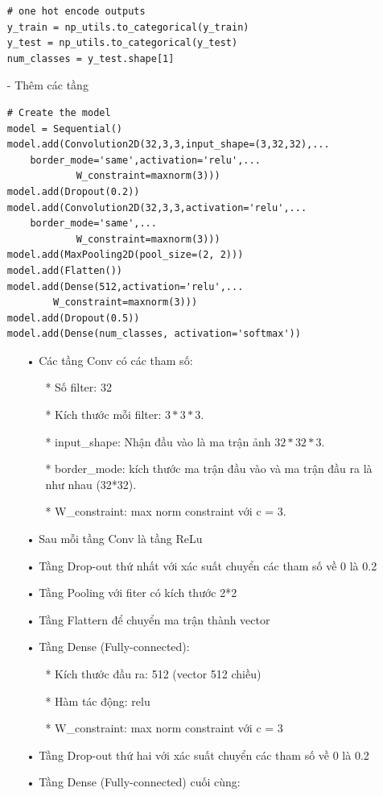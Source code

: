 \documentclass[a4paper,12pt]{report}
\begin{document}
\begin{itemize}
\begin{lstlisting}
# one hot encode outputs
y_train = np_utils.to_categorical(y_train)
y_test = np_utils.to_categorical(y_test)
num_classes = y_test.shape[1]
\end{lstlisting}
\item[-] Thêm các tầng
{\small
\begin{lstlisting}
# Create the model
model = Sequential()
model.add(Convolution2D(32,3,3,input_shape=(3,32,32),... 
 	border_mode='same',activation='relu',...
 			W_constraint=maxnorm(3)))
model.add(Dropout(0.2))
model.add(Convolution2D(32,3,3,activation='relu',...
	border_mode='same',...
			W_constraint=maxnorm(3)))
model.add(MaxPooling2D(pool_size=(2, 2)))
model.add(Flatten())
model.add(Dense(512,activation='relu',...
		W_constraint=maxnorm(3)))
model.add(Dropout(0.5))
model.add(Dense(num_classes, activation='softmax'))
\end{lstlisting}
}
\begin{itemize}
\item[•] Các tầng Conv có các tham số:
\begin{itemize}
\item[*] Số filter: 32
\item[*] Kích thước mỗi filter: $3*3*3$.
\item[*] input\_shape: Nhận đầu vào là ma trận ảnh $32*32*3$.
\item[*] border\_mode: kích thước ma trận đầu vào và ma trận đầu ra là như nhau (32*32).
\item[*] W\_constraint: max norm constraint với c = 3.
\end{itemize}
\item[•] Sau mỗi tầng Conv là tầng ReLu
\item[•] Tầng Drop-out thứ nhất với xác suất chuyển các tham số về 0 là 0.2
\item[•] Tầng Pooling với fiter có kích thước 2*2
\item[•] Tầng Flattern để chuyển ma trận thành vector 
\item[•] Tầng Dense (Fully-connected):
\begin{itemize}
\item[*] Kích thước đầu ra: 512 (vector 512 chiều)
\item[*] Hàm tác động: relu
\item[*] W\_constraint:  max norm constraint với c = 3
\end{itemize}
\item[•] Tầng Drop-out thứ hai với xác suất chuyển các tham số về 0 là 0.2
\item[•] Tầng Dense (Fully-connected) cuối cùng:

\end{itemize}
\end{itemize}
\end{document}
